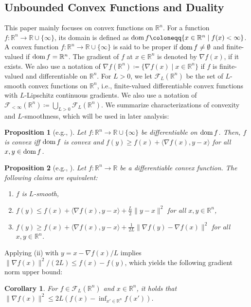\documentclass[11pt,a4paper]{article}
\theoremstyle{definition}
\theoremstyle{plain}
\newtheorem{prop}[prop]{Proposition}
\newtheorem{cor}[cor]{Corollary}
\newcommand{\RR}{{\mathbb{R}}}
\newcommand{\dom}{\mathop{\rm dom}}
\begin{document}
\subsection{Unbounded Convex Functions and Duality}
This paper mainly focuses on convex functions on $\RR^n$.
For a function $f: \RR^n \to \RR \cup \{\infty\}$, its domain is defined as $\dom f \coloneqq \{x \in \RR^n \mid f(x) < \infty\}$.
A convex function $f: \RR^n \to \RR \cup \{\infty\}$ is said to be proper if $\dom f \neq \emptyset$ and finite-valued if $\dom f = \RR^n$.
The gradient of $f$ at $x \in \RR^n$ is denoted by $\nabla f(x)$, if it exists.
We also use a notation of $\nabla f(\RR^n) \coloneqq \{\nabla f(x) \mid x \in \RR^n\}$ if $f$ is finite-valued and differentiable on $\RR^n$.
For $L > 0$, we let $\mathcal{F}_L(\RR^n)$ be the set of $L$-smooth convex functions on $\RR^n$, i.e., finite-valued differentiable convex functions with $L$-Lipschitz continuous gradients.
We also use a notation of $\mathcal{F}_{< \infty}(\RR^n) \coloneqq \bigcup_{L > 0}\mathcal{F}_L(\RR^n)$.
We summarize characterizations of convexity and $L$-smoothness, which will be used in later analysis:
\begin{prop}[{e.g., \cite[Section~3.1.3]{BV2004}}]
    \label{prop:convexity}
    Let $f: \RR^n \to \RR \cup \{\infty\}$ be differentiable on $\dom f$. Then, $f$ is convex iff $\dom f$ is convex and $f(y) \ge f(x) + \langle\nabla f(x), y - x\rangle$ for all $x, y \in \dom f$.
\end{prop}
\begin{prop}[{e.g., \cite[Theorem~5.8]{Beck2017}}]
    \label{prop:smoothness}
    Let $f: \RR^n \to \RR$ be a differentiable convex function.
    The following claims are equivalent:
    \begin{enumerate}
        \item[(i)] $f$ is $L$-smooth,
        \item[(ii)] $f(y) \le f(x) + \langle\nabla f(x), y - x\rangle + \frac{L}2\|y - x\|^2$ for all $x, y \in \RR^n$,
        \item[(iii)] $f(y) \ge f(x) + \langle\nabla f(x), y - x\rangle + \frac1{2L}\|\nabla f(y) - \nabla f(x)\|^2$ for all $x, y \in \RR^n$.
    \end{enumerate}
\end{prop}
Applying (ii) with $y = x - \nabla f(x)/L$ implies $\|\nabla f(x)\|^2/(2L) \le f(x) - f(y)$, which yields the following gradient norm upper bound:
\begin{cor}
    \label{cor:smoothness}
    For $f \in \mathcal{F}_L(\RR^n)$ and $x \in \RR^n$, it holds that $\|\nabla f(x)\|^2 \le 2L(f(x) - \inf_{x' \in \RR^n}f(x'))$.
\end{cor}
\end{document}

